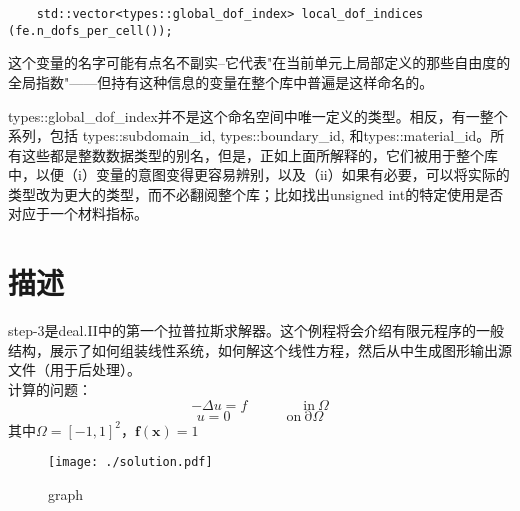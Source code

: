 \documentclass[nofonts]{ctexart} %
\begin{document}
\begin{lstlisting}
    std::vector<types::global_dof_index> local_dof_indices (fe.n_dofs_per_cell());
\end{lstlisting}
这个变量的名字可能有点名不副实--它代表"在当前单元上局部定义的那些自由度的全局指数"——但持有这种信息的变量在整个库中普遍是这样命名的。

    types::global\_dof\_index并不是这个命名空间中唯一定义的类型。相反，有一整个系列，包括 types::subdomain\_id, types::boundary\_id, 和types::material\_id。所有这些都是整数数据类型的别名，但是，正如上面所解释的，它们被用于整个库中，以便（i）变量的意图变得更容易辨别，以及（ii）如果有必要，可以将实际的类型改为更大的类型，而不必翻阅整个库；比如找出unsigned int的特定使用是否对应于一个材料指标。
\section{描述}
step-3是deal.II中的第一个拉普拉斯求解器。这个例程将会介绍有限元程序的一般结构，展示了如何组装线性系统，如何解这个线性方程，然后从中生成图形输出源文件（用于后处理）。\\
计算的问题：
\begin{equation}
 -\Delta u=f\quad\quad\quad\quad\mathrm{in~}\Omega
\end{equation}
\begin{equation}
 u=0\quad\quad\quad\quad\mathrm{on~\partial}\Omega
\end{equation}
其中$\Omega=[-1,1]^2，\textbf{f}(\textbf{x})=1$
\begin{figure}[htbp]
      \centering
      \texttt{[image: ./solution.pdf]}
      \caption{graph}
  \end{figure}
\end{document}

